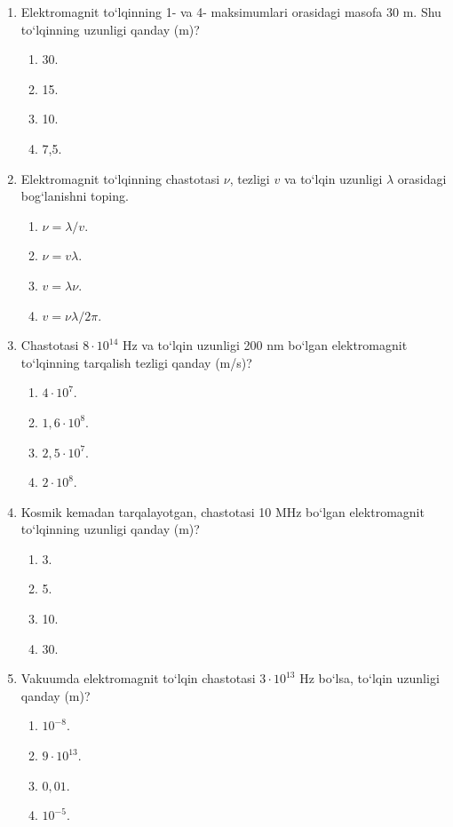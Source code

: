 \begin{enumerate}
\item Elektromagnit to‘lqinning 1- va 4- maksimumlari orasidagi masofa 30 m. Shu to‘lqinning uzunligi qanday (m)?
\begin{enumerate}[label=\Alph*)]
\item 30.
\item 15.
\item 10.
\item 7,5.
\end{enumerate}

\item Elektromagnit to‘lqinning chastotasi $\nu$, tezligi $v$ va to‘lqin uzunligi $\lambda$ orasidagi bog‘lanishni toping.
\begin{enumerate}[label=\Alph*)]
\item $\nu = \lambda/v$.
\item $\nu = v\lambda$.
\item $v = \lambda\nu$.
\item $v = \nu\lambda/2\pi$.
\end{enumerate}

\item Chastotasi $8\cdot 10^{14}$ Hz va to‘lqin uzunligi 200 nm bo‘lgan elektromagnit to‘lqinning tarqalish tezligi qanday (m/s)?
\begin{enumerate}[label=\Alph*)]
\item $4\cdot 10^7$.
\item $1,6\cdot 10^8$.
\item $2,5\cdot 10^7$.
\item $2\cdot 10^8$.
\end{enumerate}

\item Kosmik kemadan tarqalayotgan, chastotasi 10 MHz bo‘lgan elektromagnit to‘lqinning uzunligi qanday (m)?
\begin{enumerate}[label=\Alph*)]
\item 3.
\item 5.
\item 10.
\item 30.
\end{enumerate}

\item Vakuumda elektromagnit to‘lqin chastotasi $3\cdot 10^{13}$ Hz bo‘lsa, to‘lqin uzunligi qanday (m)?
\begin{enumerate}[label=\Alph*)]
\item $10^{-8}$.
\item $9\cdot 10^{13}$.
\item $0,01$.
\item $10^{-5}$.
\end{enumerate}


\end{enumerate}
